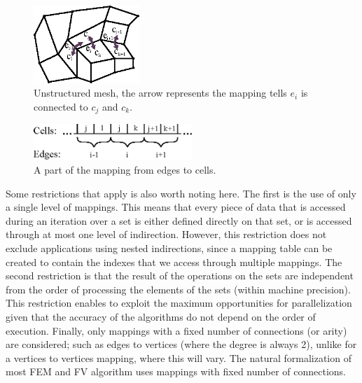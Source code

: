 \begin{figure}
\centering
\includegraphics[width=4cm]{fig/svg/unstructured.eps}
\caption{Unstructured mesh, the arrow represents the mapping tells $e_i$ is
  connected to $c_j$ and $c_k$.}
\label{fig:unstructured}
\end{figure}



\begin{figure}
\centering
\includegraphics[width=6cm]{fig/svg/mapping.eps}
\caption{A part of the mapping from edges to cells.}
\label{fig:mapping}
\end{figure}


Some restrictions that apply is also worth noting here. The first is the use of 
only a single level of mappings. This means that every piece of data that is 
accessed during an iteration over a set is either defined directly on that set, 
or is accessed through at most one level of indirection. However, this 
restriction does not exclude applications using nested indirections, since a 
mapping table can be created to contain the indexes that we access through 
multiple mappings. The second restriction is that the result of the operations 
on the sets are independent from the order of processing the elements of the 
sets (within machine precision). This restriction enables to exploit the 
maximum opportunities for parallelization given that the accuracy of the 
algorithms do not depend on the order of execution. Finally, only  mappings with 
a fixed number of connections (or arity) are considered; such as edges to 
vertices (where the degree is always 2), unlike for a vertices to vertices 
mapping, where this will vary. The natural formalization of most FEM and FV 
algorithm uses mappings with fixed number of connections.
